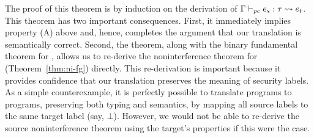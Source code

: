 The proof of this theorem is by induction on the derivation of $\Gamma
\vdash_{\mathit{pc}} e_s:\tau \leadsto e_t$. This theorem has two important
consequences. First, it immediately implies property (A) above and,
hence, completes the argument that our translation is semantically
correct. Second, the theorem, along with the binary fundamental
theorem for {\cg}, allows us to re-derive the noninterference theorem
for {\fg} (Theorem~\ref{thm:ni-fg}) directly. This re-derivation is
important because it provides confidence that our translation
preserves the meaning of security labels. As a simple counterexample,
it is perfectly possible to translate {\fg} programs to {\cg}
programs, preserving both typing and semantics, by mapping all source
labels to the same target label (say, $\bot$). However, we would not
be able to re-derive the source noninterference theorem using the
target's properties if this were the case.

